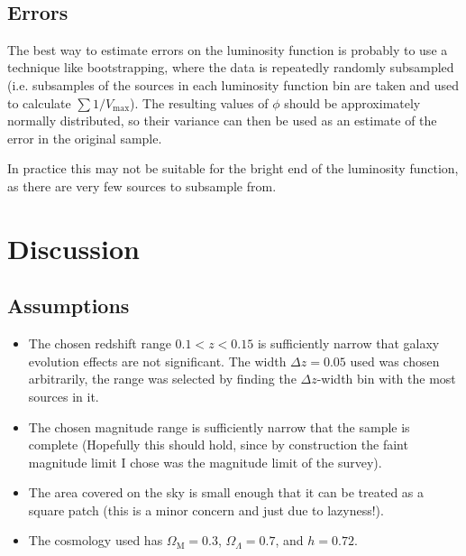 \documentclass[11pt]{article}
\providecommand{\tightlist}{%
      \setlength{\itemsep}{0pt}\setlength{\parskip}{0pt}}
\begin{document}
    \begin{center}
    \end{center}
    { \hspace*{\fill} \\}
    
    \subsection{Errors}\label{errors}

The best way to estimate errors on the luminosity function is probably
to use a technique like bootstrapping, where the data is repeatedly
randomly subsampled (i.e. subsamples of the sources in each luminosity
function bin are taken and used to calculate
\(\sum 1/V_{\mathrm{max}}\)). The resulting values of \(\phi\) should be
approximately normally distributed, so their variance can then be used
as an estimate of the error in the original sample.

In practice this may not be suitable for the bright end of the
luminosity function, as there are very few sources to subsample from.

\section{Discussion}\label{discussion}

\subsection{Assumptions}\label{assumptions}

\begin{itemize}
\tightlist
\item
  The chosen redshift range \(0.1 < z < 0.15\) is sufficiently narrow
  that galaxy evolution effects are not significant. The width
  \(\Delta z=0.05\) used was chosen arbitrarily, the range was selected
  by finding the \(\Delta z\)-width bin with the most sources in it.
\item
  The chosen magnitude range is sufficiently narrow that the sample is
  complete (Hopefully this should hold, since by construction the faint
  magnitude limit I chose was the magnitude limit of the survey).
\item
  The area covered on the sky is small enough that it can be treated as
  a square patch (this is a minor concern and just due to lazyness!).
\item
  The cosmology used has \(\Omega_{\mathrm{M}}=0.3\),
  \(\Omega_\Lambda=0.7\), and \(h=0.72\).
\end{itemize}
\end{document}
